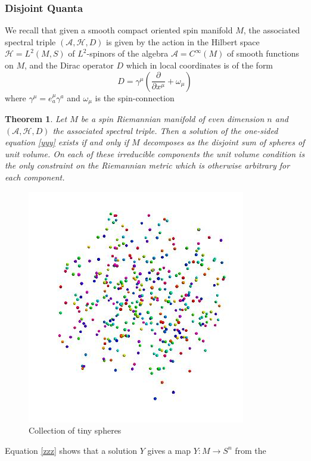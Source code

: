 \documentclass[12pt]{article}
\newtheorem{thm}{Theorem}[section]
\begin{document}
\subsubsection{Disjoint Quanta}
We recall that given a smooth compact oriented spin manifold $M$, the
associated spectral triple $(\mathcal{A},\mathcal{H},D)$ is given by the
action in the Hilbert space $\mathcal{H}=L^{2}(M,S)$ of $L^{2}$-spinors of the
algebra $\mathcal{A}=C^{\infty}(M)$ of smooth functions on $M$, and the Dirac
operator $D$ which in local coordinates is of the form
$$
D=\gamma^{\mu}\left(  \frac{\partial}{\partial x^{\mu}}+\omega_{\mu}\right)
$$
where $\gamma^{\mu}=e_{a}^{\mu}\gamma^{a}$ and $\omega_{\mu}$ is the spin-connection
\begin{thm}
Let $M$ be a spin Riemannian manifold of even dimension $n$ and
$(\mathcal{A},\mathcal{H},D)$ the associated spectral triple. Then a solution
of the one-sided equation \eqref{yyy} exists if and only if $M$ decomposes as the disjoint sum
of spheres of unit volume. On each of these irreducible components the unit
volume condition is the only constraint on the Riemannian metric which is
otherwise arbitrary for each component.	
\end{thm}
\begin{figure}[H]
\begin{center}
\includegraphics[scale=0.6]{tortriang2.jpg}
\end{center}
\caption{Collection of tiny spheres \label{tiny} }
\end{figure}
 Equation \eqref{zzz} shows that a solution
$Y$ gives a map $Y:M\rightarrow S^{n}$ from the
\end{document}
